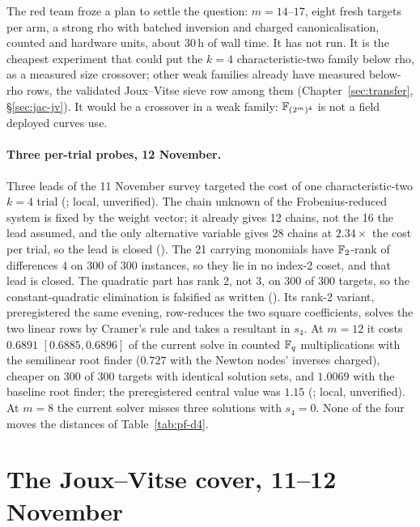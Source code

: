 The red team froze a plan to settle the question: $m=14$--$17$, eight fresh
targets per arm, a strong rho with batched inversion and charged
canonicalisation, counted and hardware units, about 30\,h of wall time.
It has not run. It is the cheapest experiment that could put the $k=4$
characteristic-two family below rho, as a measured size crossover; other
weak families already have measured below-rho rows, the validated
Joux--Vitse sieve row among them (Chapter~\ref{sec:transfer},
\S\ref{sec:jac-jv}). It would be a crossover in a weak family:
$\mathbb{F}_{(2^m)^4}$ is not a field deployed curves use.

\paragraph{Three per-trial probes, 12 November.} Three leads of the
11 November survey targeted the cost of one characteristic-two $k=4$ trial
(; local, unverified). The
chain unknown of the Frobenius-reduced system is fixed by the weight
vector; it already gives 12 chains, not the 16 the lead assumed, and the
only alternative variable gives 28 chains at $2.34\times$ the cost per
trial, so the lead is closed ().
The 21 carrying monomials have $\mathbb{F}_2$-rank of differences 4 on 300 of
300 instances, so they lie in no index-2 coset, and that lead is closed.
The quadratic part has rank 2, not 3, on 300 of 300 targets, so the
constant-quadratic elimination is falsified as written
(). Its rank-2
variant, preregistered the same evening, row-reduces the two square
coefficients, solves the two linear rows by Cramer's rule and takes a
resultant in $s_4$. At $m=12$ it costs $0.6891$ $[0.6885,0.6896]$ of the
current solve in counted $\mathbb{F}_q$ multiplications with the semilinear root
finder ($0.727$ with the Newton nodes' inverses charged), cheaper on 300 of
300 targets with identical solution sets, and $1.0069$ with the baseline
root finder; the preregistered central value was $1.15$
(; local,
unverified). At $m=8$ the current solver misses three solutions with
$s_4=0$. None of the four moves the distances of Table~\ref{tab:pf-d4}.

\section{The Joux--Vitse cover, 11--12 November}\label{sec:ext-jv-nov}

